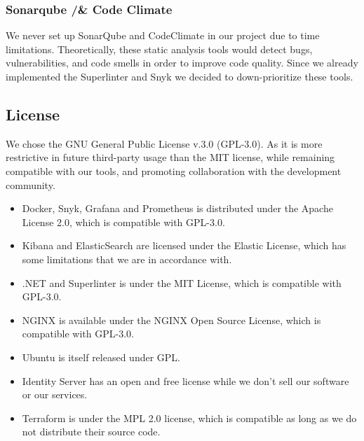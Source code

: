 \subsubsection{Sonarqube /& Code Climate}
We never set up SonarQube and CodeClimate in our project due to time limitations. Theoretically, these static analysis tools would detect bugs, vulnerabilities, and code smells in order to improve code quality. Since we already implemented the Superlinter and Snyk we decided to down-prioritize these tools.

\subsection{License}

We chose the GNU General Public License v.3.0 (GPL-3.0). As it is more restrictive in future third-party usage than the MIT license, while remaining compatible with our tools, and promoting collaboration with the development community.

\begin{itemize}
    \item Docker, Snyk, Grafana and Prometheus is distributed under the Apache License 2.0, which is compatible with GPL-3.0.
    \item Kibana and ElasticSearch are licensed under the Elastic License, which has some limitations that we are in accordance with.
    \item .NET and Superlinter is under the MIT License, which is compatible with GPL-3.0.
    \item NGINX is available under the NGINX Open Source License, which is compatible with GPL-3.0.
    \item Ubuntu is itself released under GPL.
    \item Identity Server has an open and free license while we don't sell our software or our services.
    \item Terraform is under the MPL 2.0 license, which is compatible as long as we do not distribute their source code.
\end{itemize}
